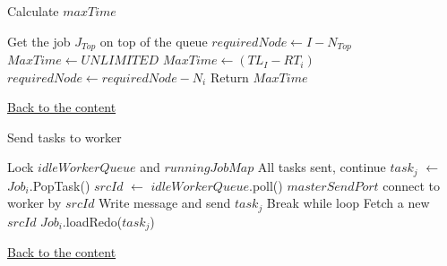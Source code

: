 \begin{algorithm}[htb]
    \caption{Calculate $maxTime$}\label{algo:maxTime}
    \begin{algorithmic}[1]
        \State Get the job $J_{Top}$ on top of the queue
        \State $requiredNode\gets I-N_{Top}$
        \State $MaxTime\gets UNLIMITED$
            \State $MaxTime\gets (TL_{I}-RT_{i})$
            \State $requiredNode\gets requiredNode-N_{i}$
                \State Return $MaxTime$
            \EndIf
        \EndFor
        \EndProcedure
    \end{algorithmic}
    \hyperlink{Algo2}{Back to the content}
\end{algorithm}
% 

\begin{algorithm}
    \caption{Send tasks to worker}\label{algo:sendTask}
    \begin{algorithmic}[1]
        \State Lock $idleWorkerQueue$ and $runningJobMap$
                \State All tasks sent, continue
            \EndIf
            \State $task_{j}$ $\gets$  $Job_{i}$.PopTask()
            \State $srcId$ $\gets$  $idleWorkerQueue$.poll()
                \State $masterSendPort$ connect to worker by $srcId$
                \State Write message and send $task_{j}$
                    \State Break while loop
                \Else
                    \State Fetch a new $srcId$
                \EndIf
            \EndWhile
                \State $Job_{i}$.loadRedo($task_{j}$)
            \EndIf
        \EndFor
        \EndProcedure
    \end{algorithmic}
    \hyperlink{Algo3}{Back to the content}
\end{algorithm}

